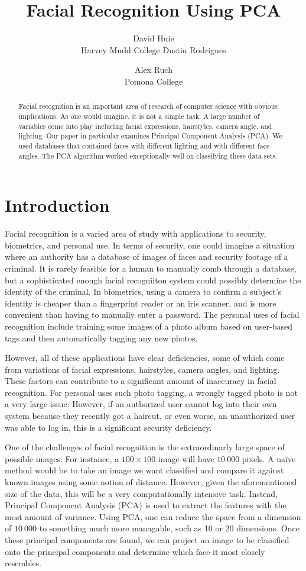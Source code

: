 \documentclass[letterpaper]{article}
\title{Facial Recognition Using PCA}
\author{David Huie \\ Harvey Mudd College \And Dustin Rodrigues \and
Alex Ruch \\ Pomona College}
\begin{document}
\nocite{pca} 
\nocite{pca2}
\nocopyright
\maketitle
\begin{abstract}
Facial recognition is an important area of research of computer science with obvious implications. As one would imagine, it is not a simple task.  A large number of variables come into play including facial expressions, hairstyles, camera angle, and lighting. Our paper in particular examines Principal Component Analysis (PCA).  We used databases that contained faces with different lighting and with different face angles.  The PCA algorithm worked exceptionally well on classifying these data sets.
\end{abstract}
\section{Introduction}
Facial recognition is a varied area of study with applications to security, biometrics, and personal use.  In terms of security, one could imagine a situation where an authority has a database of images of faces and security footage of a criminal.  It is rarely feasible for a human to manually comb through a database, but a sophisticated enough facial recogniiton system could possibly determine the identity of the criminal.  In biometrics, using a camera to confirm a subject's identity is cheaper than a fingerprint reader or an iris scanner, and is more convenient than having to manually enter a password.  The personal uses of facial recognition include training some images of a photo album based on user-based tags and then automatically tagging any new photos.

However, all of these applications have clear deficiencies, some of which come from variations of facial expressions, hairstyles, camera angles, and lighting.  These factors can contribute to a significant amount of inaccuracy in facial recognition. For personal uses such photo tagging, a wrongly tagged photo is not a very large issue.  However, if an authorized user cannot log into their own system because they recently got a haircut, or even worse, an unauthorized user was able to log in, this is a significant security deficiency. 

One of the challenges of facial recognition is the extraordinarly large space of possible images.  For instance, a $100\times100$ image will have $10\ 000$ pixels. A na\"ive method would be to take an image we want classified and compare it against known images using some notion of distance.  However, given the aforementioned size of the data, this will be a very computationally intensive task.  Instead, Principal Component Analysis (PCA) is used to extract the features with the most amount of variance. Using PCA, one can reduce the space from a dimension of $10\ 000$ to something much more managable, such as 10 or 20 dimensions.  Once these principal components are found, we can project an image to be classified onto the principal components and determine which face it most closely resembles.
\end{document}
